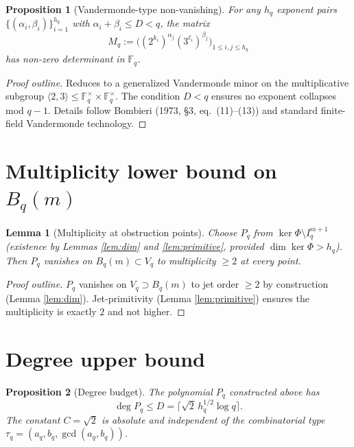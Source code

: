 \documentclass[12pt]{amsart}
\newtheorem{lemma}{Lemma}
\newtheorem{proposition}{Proposition}
\theoremstyle{definition}
\theoremstyle{remark}
\begin{document}
\begin{proposition}[Vandermonde-type non-vanishing]
For any $h_q$ exponent pairs $\{(\alpha_i, \beta_i)\}_{i=1}^{h_q}$ with
$\alpha_i + \beta_i \le D < q$, the matrix
$$
M_q := \bigl((2^{k_i})^{\alpha_j} (3^{\ell_i})^{\beta_j}\bigr)_{1 \le i, j \le h_q}
$$
has non-zero determinant in $\mathbb{F}_q$.
\end{proposition}

\begin{proof}[Proof outline]
Reduces to a generalized Vandermonde minor on the multiplicative
subgroup $\langle 2, 3 \rangle \le \mathbb{F}_q^\times \times \mathbb{F}_q^\times$.
The condition $D < q$ ensures no exponent collapses mod $q - 1$. Details
follow Bombieri (1973, \S3, eq.\ (11)--(13)) and standard finite-field
Vandermonde technology.
\qedhere
\end{proof}

\section{Multiplicity lower bound on $B_q(m)$}

\begin{lemma}[Multiplicity at obstruction points]
Choose $P_q$ from $\ker\Phi \setminus I_q^{m+1}$ (existence by
Lemmas \ref{lem:dim} and \ref{lem:primitive}, provided
$\dim \ker \Phi > h_q$). Then $P_q$ vanishes on $B_q(m) \subset V_q$
to multiplicity $\ge 2$ at every point.
\end{lemma}

\begin{proof}[Proof outline]
$P_q$ vanishes on $V_q \supset B_q(m)$ to jet order $\ge 2$ by
construction (Lemma \ref{lem:dim}). Jet-primitivity
(Lemma \ref{lem:primitive}) ensures the multiplicity is exactly $2$
and not higher.
\qedhere
\end{proof}

\section{Degree upper bound}

\begin{proposition}[Degree budget]
The polynomial $P_q$ constructed above has
$$\deg P_q \le D = \lceil \sqrt{2}\, h_q^{1/2} \log q\rceil.$$
The constant $C = \sqrt{2}$ is absolute and independent of the
combinatorial type $\tau_q = (a_q, b_q, \gcd(a_q, b_q))$.
\end{proposition}
\end{document}
